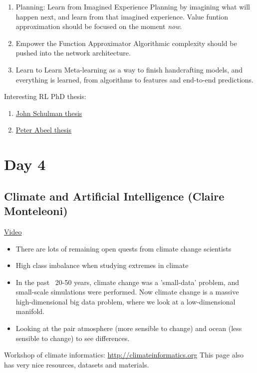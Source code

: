 \documentclass[12pt, english]{article}
\begin{document}
\begin{enumerate}
  \item Planning: Learn from Imagined Experience
  Planning by imagining what will happen next, and learn from that imagined experience. Value funtion approximation should be focused on the moment \textit{now}.

  \item Empower the Function Approximator
  Algorithmic complexity should be pushed into the network architecture.

  \item Learn to Learn
  Meta-learning as a way to finish handcrafting models, and everything is learned, from algorithms to features and end-to-end predictions.
\end{enumerate}

Interesting RL PhD thesis:
\begin{enumerate}
  \item \href{http://joschu.net/docs/thesis.pdf}{John Schulman thesis}
  \item \href{http://ai.stanford.edu/~pabbeel//thesis/thesis.pdf}{Peter Abeel thesis}
\end{enumerate}

\section{Day 4}

\subsection{Climate and Artificial Intelligence (Claire Monteleoni)}
\href{http://tv.vera.com.uy/video/55352}{Video}

\begin{itemize}
  \item There are lots of remaining open quests from climate change scientists
  \item High class imbalance when studying extremes in climate
  \item In the past ~20-50 years, climate change was a 'small-data' problem, and small-scale simulations were performed. Now climate change is a massive high-dimensional big data problem, where we look at a low-dimensional manifold.
  \item Looking at the pair atmosphere (more sensible to change) and ocean (less sensible to change) to see differences.
\end{itemize}

Workshop of climate informatics: \url{http://climateinformatics.org}
This page also has very nice resources, datasets and materials.
\end{document}
